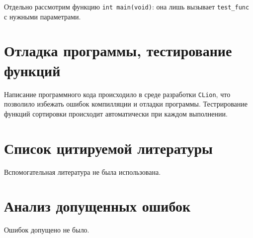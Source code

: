 \documentclass[a4paper,12pt,titlepage,finall]{article}
\begin{document}
Отдельно рассмотрим функцию \texttt{int main(void)}: она лишь вызывает \texttt{test\_func} с нужными параметрами.

\newpage

\section{Отладка программы, тестирование функций}

Написание программного кода происходило в среде разработки \texttt{CLion}, что позволило избежать ошибок компилляции и отладки программы. Тестрирование функций сортировки происходит автоматически при каждом выполнении.

\newpage

\section{Список цитируемой литературы}

Вспомогательная литература не была использована.

\newpage

\section{Анализ допущенных ошибок}

Ошибок допущено не было.
\end{document}
